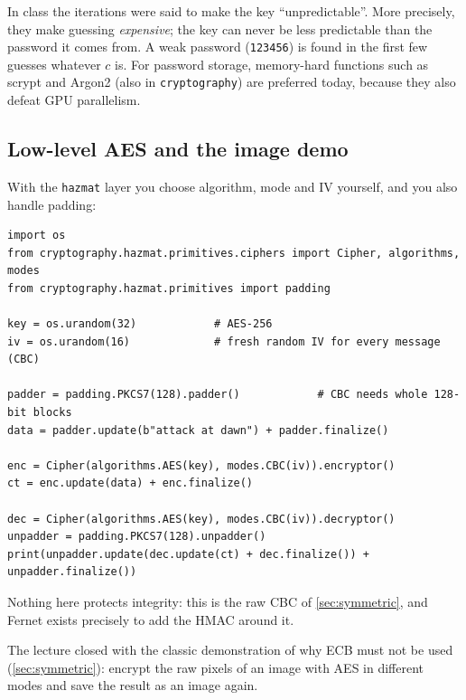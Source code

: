 \begin{remark}
In class the iterations were said to make the key \enquote{unpredictable}. More precisely, they make guessing \emph{expensive}; the key can never be less predictable than the password it comes from. A weak password (\texttt{123456}) is found in the first few guesses whatever $c$ is. For password storage, memory-hard functions such as scrypt and Argon2 (also in \texttt{cryptography}) are preferred today, because they also defeat GPU parallelism.
\end{remark}

\subsection{Low-level AES and the image demo}

With the \texttt{hazmat} layer you choose algorithm, mode and IV yourself, and you also handle padding:

\begin{verbatim}
import os
from cryptography.hazmat.primitives.ciphers import Cipher, algorithms, modes
from cryptography.hazmat.primitives import padding

key = os.urandom(32)            # AES-256
iv = os.urandom(16)             # fresh random IV for every message (CBC)

padder = padding.PKCS7(128).padder()            # CBC needs whole 128-bit blocks
data = padder.update(b"attack at dawn") + padder.finalize()

enc = Cipher(algorithms.AES(key), modes.CBC(iv)).encryptor()
ct = enc.update(data) + enc.finalize()

dec = Cipher(algorithms.AES(key), modes.CBC(iv)).decryptor()
unpadder = padding.PKCS7(128).unpadder()
print(unpadder.update(dec.update(ct) + dec.finalize()) + unpadder.finalize())
\end{verbatim}

Nothing here protects integrity: this is the raw CBC of \cref{sec:symmetric}, and Fernet exists precisely to add the HMAC around it.

The lecture closed with the classic demonstration of why ECB must not be used (\cref{sec:symmetric}): encrypt the raw pixels of an image with AES in different modes and save the result as an image again.

